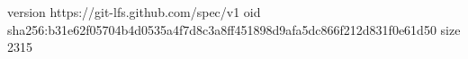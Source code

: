 version https://git-lfs.github.com/spec/v1
oid sha256:b31e62f05704b4d0535a4f7d8c3a8ff451898d9afa5dc866f212d831f0e61d50
size 2315
